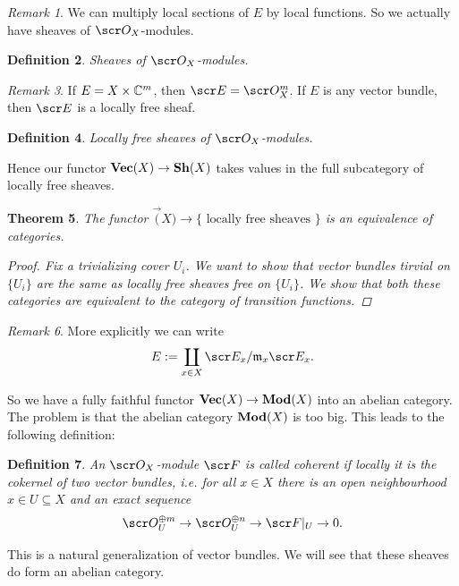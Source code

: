 \documentclass[A4paper, british, reqno]{amsart}
\theoremstyle{darkgreentheorem}
\newtheorem{thm}{Theorem}[section]
\theoremstyle{darkbluedefinition}
\newtheorem{defn}[thm]{Definition}
\theoremstyle{darkredexample}
\theoremstyle{remark}
\newtheorem{rem}[thm]{Remark}
\newcommand{\1}{\mathbbm{1}}
\newcommand{\op}{\oplus}
\newcommand{\sub}{\subseteq}
\begin{document}
\begin{rem}
    We can multiply local sections of $E$ by local functions.
    So we actually have sheaves of $\O_{X}$-modules.
\end{rem}

\begin{defn}
    Sheaves of $\O_{X}$-modules.
\end{defn}

\begin{rem}
    If $E=X\times \mathbb{C}^{m}$, then $\E=\O_{X}^{m}$.
    If $E$ is any vector bundle, then $\E$ is a locally free sheaf.
\end{rem}

\begin{defn}
    Locally free sheaves of $\O_{X}$-modules.
\end{defn}

Hence our functor $\mathbf{Vec}(X)\to \mathbf{Sh}(X)$ takes values in the full subcategory of locally free sheaves.

\begin{thm}
    The functor $\Vec(X)\to \{ \text{ locally free sheaves }\}$ is an equivalence of categories.
    \begin{proof}
	Fix a trivializing cover $U_{i}$.
	We want to show that vector bundles tirvial on $\{U_{i}\}$ are the same as locally free sheaves free on $\{U_{i}\}$.
	We show that both these categories are equivalent to the category of transition functions.
    \end{proof}
\end{thm}

\begin{rem}
    More explicitly we can write
    \[ E:=\coprod_{x\in X} \E_{x}/\m_{x}\E_{x}. \]
\end{rem}

So we have a fully faithful functor $\mathbf{Vec}(X)\to \mathbf{Mod}(X)$ into an abelian category.
The problem is that the abelian category $\mathbf{Mod}(X)$ is too big.
This leads to the following definition:

\begin{defn}
    An $\O_{X}$-module $\F$ is called \textit{coherent} if locally it is the cokernel of two vector bundles, i.e. for all $x\in X$ there is an open neighbourhood $x\in U\sub X$ and an exact sequence
    \[ \O_{U}^{\op m}\to \O_{U}^{\op n}\to \F|_{U}\to 0.\]
\end{defn}

This is a natural generalization of vector bundles.
We will see that these sheaves do form an abelian category.
\end{document}
